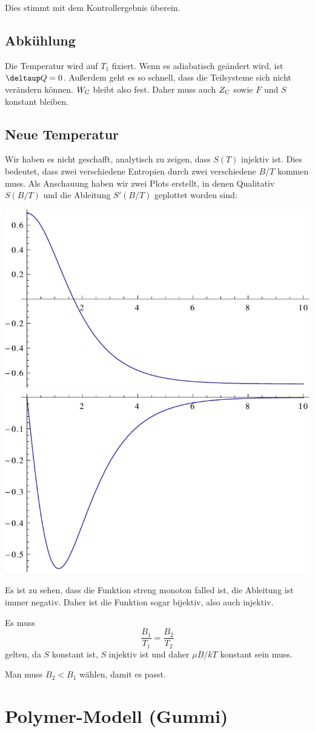 Dies stimmt mit dem Kontrollergebnis überein.

\subsection{Abkühlung}

Die Temperatur wird auf $T_1$ fixiert. Wenn es adiabatisch geändert wird, ist
$\deltaup Q = 0$. Außerdem geht es so schnell, dass die Teilsysteme sich nicht
verändern können. $W_\text C$ bleibt also fest. Daher muss auch $Z_\text C$
sowie $F$ und $S$ konstant bleiben.

\subsection{Neue Temperatur}

Wir haben es nicht geschafft, analytisch zu zeigen, dass $S(T)$ injektiv ist.
Dies bedeutet, dass zwei verschiedene Entropien durch zwei verschiedene $B/T$
kommen muss. Als Anschauung haben wir zwei Plots erstellt, in denen Qualitativ
$S(B/T)$ und die Ableitung $S'(B/T)$ geplottet worden sind:

\includegraphics[width=.45\textwidth]{2b-S.pdf}
\hfill
\includegraphics[width=.45\textwidth]{2b-dS.pdf}

Es ist zu sehen, dass die Funktion streng monoton falled ist, die Ableitung ist
immer negativ. Daher ist die Funktion sogar bijektiv, also auch injektiv.

Es muss
\[
    \frac{B_1}{T_1} = \frac{B_2}{T_2}
\]
gelten, da $S$ konstant ist, $S$ injektiv ist und daher $\mu B/kT$ konstant
sein muss.

Man muss $B_2 < B_1$ wählen, damit es passt.

\section{Polymer-Modell (Gummi)}


